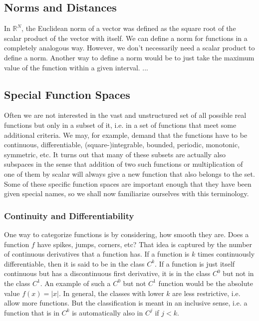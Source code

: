 \subsection{Norms and Distances}
In $\mathbb{R}^N$, the Euclidean norm of a vector was defined as the square root of the scalar product of the vector with itself. We can define a norm for functions in a completely analogous way. However, we don't necessarily need a scalar product to define a norm. Another way to define a norm would be to just take the maximum value of the function within a given interval. ...

\subsection{Special Function Spaces}
Often we are not interested in the vast and unstructured set of all possible real functions but only in a subset of it, i.e. in a set of functions that meet some additional criteria. We may, for example, demand that the functions have to be continuous, differentiable, (square-)integrable, bounded, periodic, monotonic, symmetric, etc. It turns out that many of these subsets are actually also subspaces in the sense that addition of two such functions or multiplication of one of them by scalar will always give a new function that also belongs to the set. Some of these specific function spaces are important enough that they have been given special names, so we shall now familiarize ourselves with this terminology.

\subsubsection{Continuity and Differentiability}
One way to categorize functions is by considering, how smooth they are. Does a function $f$ have spikes, jumps, corners, etc? That idea is captured by the number of continuous derivatives that a function has. If a function is $k$ times continuously differentiable, then it is said to be in the class $C^k$. If a function is just itself continuous but has a discontinuous first derivative, it is in the class $C^0$ but not in the class $C^1$. An example of such a $C^0$ but not $C^1$ function would be the absolute value $f(x) = |x|$. In general, the classes with lower $k$ are less restrictive, i.e. allow more functions. But the classification is meant in an inclusive sense, i.e. a function that is in $C^k$ is automatically also in $C^j$ if $j < k$.

